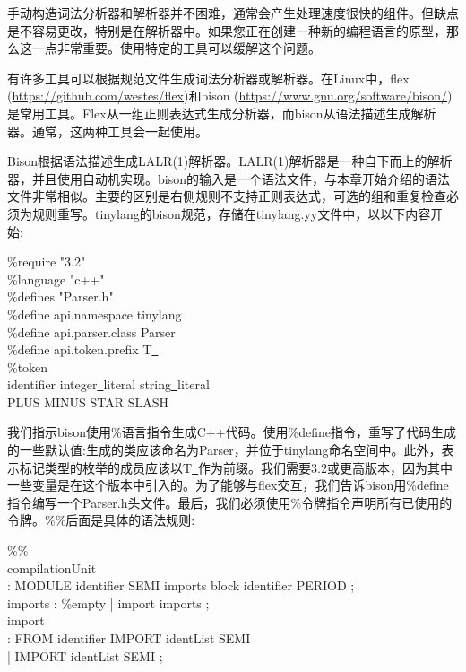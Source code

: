 手动构造词法分析器和解析器并不困难，通常会产生处理速度很快的组件。但缺点是不容易更改，特别是在解析器中。如果您正在创建一种新的编程语言的原型，那么这一点非常重要。使用特定的工具可以缓解这个问题。\par

有许多工具可以根据规范文件生成词法分析器或解析器。在Linux中，flex (\url{https://github.com/westes/flex})和bison (\url{https://www.gnu.org/software/bison/})是常用工具。Flex从一组正则表达式生成分析器，而bison从语法描述生成解析器。通常，这两种工具会一起使用。\par

Bison根据语法描述生成LALR(1)解析器。LALR(1)解析器是一种自下而上的解析器，并且使用自动机实现。bison的输入是一个语法文件，与本章开始介绍的语法文件非常相似。主要的区别是右侧规则不支持正则表达式，可选的组和重复检查必须为规则重写。tinylang的bison规范，存储在tinylang.yy文件中，以以下内容开始:\par

\begin{tcolorbox}[colback=white,colframe=black]
\%require "3.2" \\
\%language "c++" \\
\%defines "Parser.h" \\
\%define api.namespace {tinylang} \\
\%define api.parser.class {Parser} \\
\%define api.token.prefix {T\underline{~}} \\
\%token \\
identifier integer\underline{~}literal string\underline{~}literal \\
PLUS MINUS STAR SLASH
\end{tcolorbox}

我们指示bison使用\%语言指令生成C++代码。使用\%define指令，重写了代码生成的一些默认值:生成的类应该命名为Parser，并位于tinylang命名空间中。此外，表示标记类型的枚举的成员应该以T\underline{~}作为前缀。我们需要3.2或更高版本，因为其中一些变量是在这个版本中引入的。为了能够与flex交互，我们告诉bison用\%define指令编写一个Parser.h头文件。最后，我们必须使用\%令牌指令声明所有已使用的令牌。\%\%后面是具体的语法规则:\par

\begin{tcolorbox}[colback=white,colframe=black]
\%\% \\
compilationUnit \\
\hspace*{0.5cm}: MODULE identifier SEMI imports block identifier PERIOD ; \\
imports : \%empty | import imports ; \\
import \\
\hspace*{0.5cm}: FROM identifier IMPORT identList SEMI \\
\hspace*{0.5cm}| IMPORT identList SEMI ;
\end{tcolorbox}

